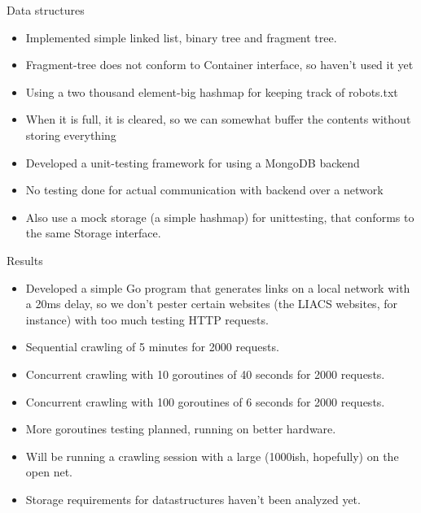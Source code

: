 \documentclass[ignorenonframetext,]{beamer}
\begin{document}
\begin{frame}{Data structures}

\begin{itemize}
\itemsep1pt\parskip0pt
\item
  Implemented simple linked list, binary tree and fragment tree.
\item
  Fragment-tree does not conform to Container interface, so haven't used
  it yet
\item
  Using a two thousand element-big hashmap for keeping track of
  robots.txt
\item
  When it is full, it is cleared, so we can somewhat buffer the contents
  without storing everything
\item
  Developed a unit-testing framework for using a MongoDB backend
\item
  No testing done for actual communication with backend over a network
\item
  Also use a mock storage (a simple hashmap) for unittesting, that
  conforms to the same Storage interface.
\end{itemize}

\end{frame}

\begin{frame}{Results}

\begin{itemize}
\itemsep1pt\parskip0pt
\item
  Developed a simple Go program that generates links on a local network
  with a 20ms delay, so we don't pester certain websites (the LIACS
  websites, for instance) with too much testing HTTP requests.
\item
  Sequential crawling of 5 minutes for 2000 requests.
\item
  Concurrent crawling with 10 goroutines of 40 seconds for 2000
  requests.
\item
  Concurrent crawling with 100 goroutines of 6 seconds for 2000
  requests.
\item
  More goroutines testing planned, running on better hardware.
\item
  Will be running a crawling session with a large (1000ish, hopefully)
  on the open net.
\item
  Storage requirements for datastructures haven't been analyzed yet.
\end{itemize}

\end{frame}
\end{document}
